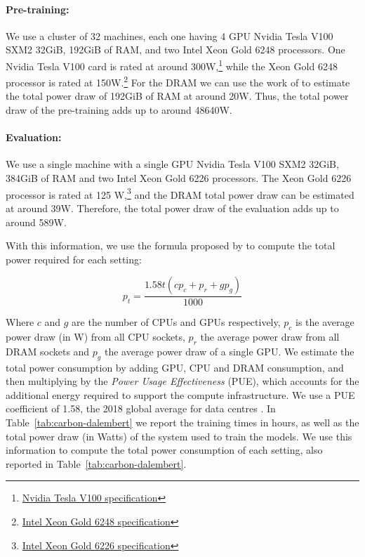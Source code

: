 \paragraph{Pre-training:} We use a cluster of 32 machines, each one having 4 GPU Nvidia Tesla V100 SXM2 32GiB, 192GiB of RAM, and two Intel Xeon Gold 6248 processors. One Nvidia Tesla V100 card is rated at around 300W,\footnote{\href{https://www.nvidia.com/en-us/data-center/v100/}{ Nvidia Tesla V100 specification}} while the Xeon Gold 6248 processor is rated at 150W.\footnote{\href{https://ark.intel.com/content/www/us/en/ark/products/192446/intel-xeon-gold-6248-processor-27-5m-cache-2-50-ghz.html}{Intel Xeon Gold 6248 specification}} For the DRAM we can use the work of  to estimate the total power draw of 192GiB of RAM at around 20W. Thus, the total power draw of the pre-training adds up to around 48640W.

\paragraph{Evaluation:} We use a single machine with a single GPU Nvidia Tesla V100 SXM2 32GiB, 384GiB of RAM and two Intel Xeon Gold 6226 processors. The Xeon Gold 6226 processor is rated at 125 W,\footnote{\href{https://ark.intel.com/content/www/us/en/ark/products/193957/intel-xeon-gold-6226-processor-19-25m-cache-2-70-ghz.html}{Intel Xeon Gold 6226 specification}} and the DRAM total power draw can be estimated at around 39W. Therefore, the total power draw of the evaluation adds up to around 589W.

With this information, we use the formula proposed by  to compute the total power required for each setting:

\begin{equation*}
    p_t = \frac{1.58t(cp_{c} + p_r + gp_g)}{1000}
\end{equation*}

Where $c$ and $g$ are the number of CPUs and GPUs respectively, $p_c$ is the average power draw (in W) from all CPU sockets, $p_r$ the average power draw from all DRAM sockets and $p_g$ the average power draw of a single GPU. We estimate the total power consumption by adding GPU, CPU and DRAM consumption, and then multiplying by the \emph{Power Usage Effectiveness} (PUE), which accounts for the additional energy required to support the compute infrastructure. We use a PUE coefficient of 1.58, the 2018 global average for data centres \cite{strubell-etal-2019-energy}. In Table~\ref{tab:carbon-dalembert} we report the training times in hours, as well as the total power draw (in Watts) of the system used to train the models. We use this information to compute the total power consumption of each setting, also reported in Table~\ref{tab:carbon-dalembert}.

